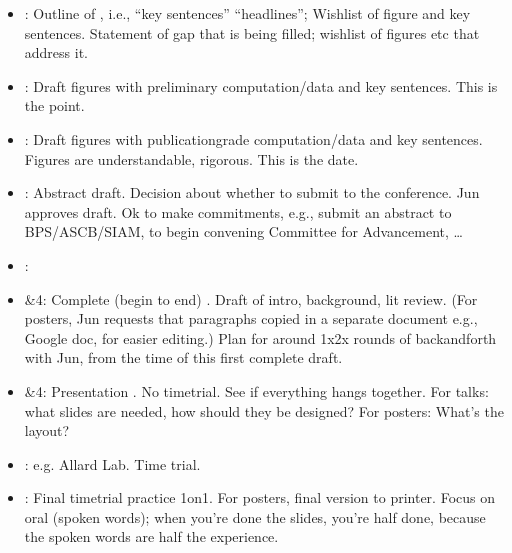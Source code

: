 \documentclass[letterpaper,10pt,english]{sphinxmanual}
\begin{document}
\begin{itemize}
\item {} 
: Outline of , i.e., “key sentences” “headlines”; Wishlist of figure and key sentences. Statement of gap that is being filled; wishlist of figures etc that address it.

\item {} 
: Draft figures with preliminary computation/data and key sentences. This is the  point.

\item {} 
: Draft figures with publication\sphinxhyphen{}grade computation/data and key sentences. Figures are understandable, rigorous. This is the  date.

\item {} 
: Abstract draft. Decision about whether to submit to the conference. Jun approves draft. Ok to make commitments, e.g., submit an abstract to BPS/ASCB/SIAM, to begin convening Committee for Advancement, …

\item {} 
: 

\item {} 
\&4: Complete (begin to end) . Draft of intro, background, lit review. (For posters, Jun requests that paragraphs copied in a separate document e.g., Google doc, for easier editing.) Plan for around 1x\sphinxhyphen{}2x rounds of back\sphinxhyphen{}and\sphinxhyphen{}forth with Jun, from the time of this first complete draft.

\item {} 
\&4: Presentation . No time\sphinxhyphen{}trial. See if everything hangs together. For talks: what slides are needed, how should they be designed? For posters: What’s the layout?

\item {} 
:  e.g. Allard Lab. Time trial.

\item {} 
: Final time\sphinxhyphen{}trial practice 1\sphinxhyphen{}on\sphinxhyphen{}1.  For posters, final version to printer. Focus on oral (spoken words); when you’re done the slides, you’re half done, because the spoken words are half the experience.

\end{itemize}
\end{document}

